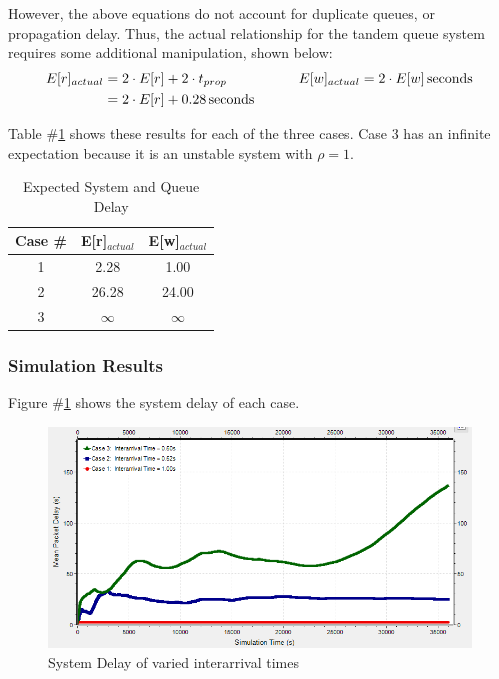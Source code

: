 \documentclass{article}
\begin{document}
However, the above equations do not account for duplicate queues, or propagation delay.
Thus, the actual relationship for the tandem queue system requires some additional manipulation, shown below:
\begin{align*}
 E[r]_{actual} &= 2 \cdot E[r] + 2 \cdot t_{prop} \hspace{.15\textwidth} E[w]_{actual} = 2 \cdot E[w] \, \text{seconds}	\\
			   &=2 \cdot E[r] + 0.28 \, \text{seconds}  \\
\end{align*}

Table \#\ref{tab:expectDelay} shows these results for each of the three cases.
Case 3 has an infinite expectation because it is an unstable system with $\rho = 1$.
\begin{table}[h!]
\centering
\begin{tabular}{|c|c|c|} \hline
\textbf{Case \#} & \textbf{E[r]$_{actual}$} & \textbf{E[w]$_{actual}$} \\ \hline
1 & 2.28 & 1.00  \\ \hline
2 & 26.28 & 24.00 \\ \hline
3 & $\infty$ & $\infty$ \\ \hline 
\end{tabular}
\caption{Expected System and Queue Delay}
\label{tab:expectDelay}
\end{table}

\newpage
\subsubsection*{Simulation Results}
Figure \#\ref{DelayPlot} shows the system delay of each case.

\begin{figure}[h!]
	\begin{center}
	\includegraphics[scale=0.85]{Images/DelayPlot.PNG}
	\vspace{-.25cm}
	\caption{System Delay of varied interarrival times}
	\label{DelayPlot}
	\end{center}
\end{figure}
\end{document}
